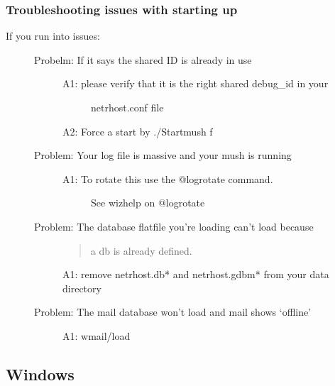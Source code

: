 \documentclass[letterpaper,10pt,english]{sphinxmanual}
\begin{document}
\subsubsection{Troubleshooting issues with starting up}
\label{\detokenize{installation:troubleshooting-issues-with-starting-up}}\begin{description}
\item[{If you run into issues:}] \leavevmode\begin{description}
\item[{Probelm: If it says the shared ID is already in use}] \leavevmode\begin{description}
\item[{A1: please verify that it is the right shared debug\_id in your}] \leavevmode
\sphinxAtStartPar
netrhost.conf file

\end{description}

\sphinxAtStartPar
A2: Force a start by ./Startmush \sphinxhyphen{}f

\item[{Problem: Your log file is massive and your mush is running}] \leavevmode\begin{description}
\item[{A1: To rotate this use the @logrotate command.}] \leavevmode
\sphinxAtStartPar
See wizhelp on @logrotate

\end{description}

\item[{Problem: The database flatfile you’re loading can’t load because}] \leavevmode\begin{quote}

\sphinxAtStartPar
a db is already defined.
\end{quote}

\sphinxAtStartPar
A1: remove netrhost.db* and netrhost.gdbm* from your data directory

\item[{Problem: The mail database won’t load and mail shows ‘offline’}] \leavevmode
\sphinxAtStartPar
A1: wmail/load

\end{description}

\end{description}


\subsection{Windows}
\label{\detokenize{installation:windows}}
\end{document}
